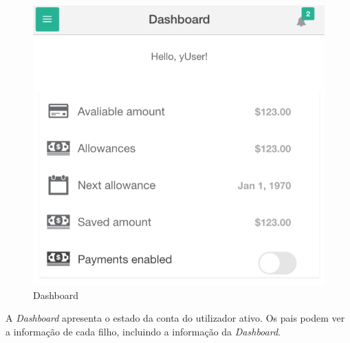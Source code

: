\begin{figure}[H]
	\begin{center}
		\includegraphics[width=0.5
		\textwidth]{dashboard/dashboard.png}
	\end{center}
	\caption{Dashboard}
	\label{fig:2}
\end{figure}

A \textit{Dashboard} apresenta o estado da conta do utilizador ativo. Os pais podem ver a informação de cada filho, incluindo a informação da \textit{Dashboard}.